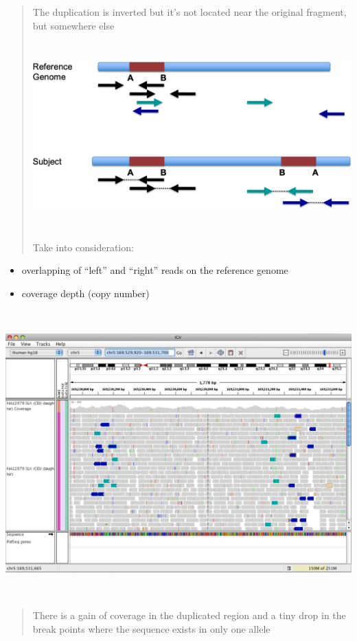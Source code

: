 \begin{quote}
The duplication is inverted but it's not located near the original
fragment, but somewhere else

\includegraphics[width=6.11483in,height=2.82187in]{image25.png}

Take into consideration:
\end{quote}

\begin{itemize}
\item
  overlapping of ``left'' and ``right'' reads on the reference genome
\item
  coverage depth (copy number)
\end{itemize}

\includegraphics[width=6.29059in,height=4.34375in]{image26.jpeg}

\begin{quote}
There is a gain of coverage in the duplicated region and a tiny drop in
the break points where the sequence exists in only one allele
\end{quote}

